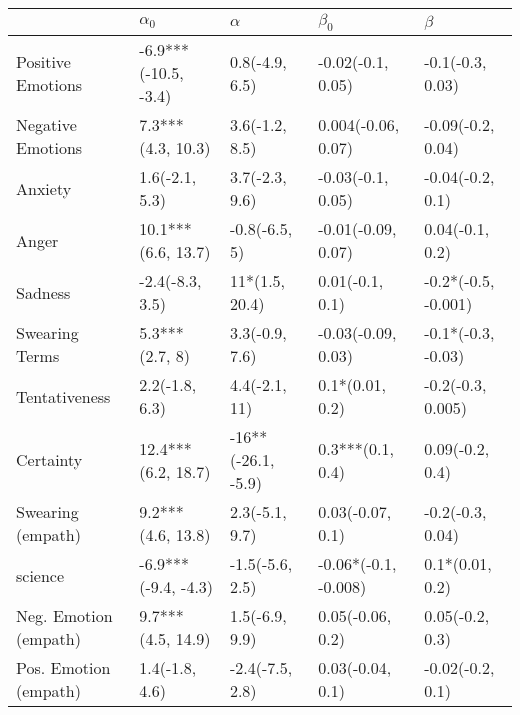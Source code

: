 \begin{tabular}{lllll}
\toprule
{} &            $\alpha_0$ &            $\alpha$ &             $\beta_0$ &              $\beta$ \\
\midrule
Positive Emotions     &  -6.9***(-10.5, -3.4) &      0.8(-4.9, 6.5) &     -0.02(-0.1, 0.05) &     -0.1(-0.3, 0.03) \\
Negative Emotions     &     7.3***(4.3, 10.3) &      3.6(-1.2, 8.5) &    0.004(-0.06, 0.07) &    -0.09(-0.2, 0.04) \\
Anxiety               &        1.6(-2.1, 5.3) &      3.7(-2.3, 9.6) &     -0.03(-0.1, 0.05) &     -0.04(-0.2, 0.1) \\
Anger                 &    10.1***(6.6, 13.7) &       -0.8(-6.5, 5) &    -0.01(-0.09, 0.07) &      0.04(-0.1, 0.2) \\
Sadness               &       -2.4(-8.3, 3.5) &      11*(1.5, 20.4) &       0.01(-0.1, 0.1) &  -0.2*(-0.5, -0.001) \\
Swearing Terms        &        5.3***(2.7, 8) &      3.3(-0.9, 7.6) &    -0.03(-0.09, 0.03) &   -0.1*(-0.3, -0.03) \\
Tentativeness         &        2.2(-1.8, 6.3) &       4.4(-2.1, 11) &       0.1*(0.01, 0.2) &    -0.2(-0.3, 0.005) \\
Certainty             &    12.4***(6.2, 18.7) &  -16**(-26.1, -5.9) &      0.3***(0.1, 0.4) &      0.09(-0.2, 0.4) \\
Swearing (empath)     &     9.2***(4.6, 13.8) &      2.3(-5.1, 9.7) &      0.03(-0.07, 0.1) &     -0.2(-0.3, 0.04) \\
science               &   -6.9***(-9.4, -4.3) &     -1.5(-5.6, 2.5) &  -0.06*(-0.1, -0.008) &      0.1*(0.01, 0.2) \\
Neg. Emotion (empath) &     9.7***(4.5, 14.9) &      1.5(-6.9, 9.9) &      0.05(-0.06, 0.2) &      0.05(-0.2, 0.3) \\
Pos. Emotion (empath) &        1.4(-1.8, 4.6) &     -2.4(-7.5, 2.8) &      0.03(-0.04, 0.1) &     -0.02(-0.2, 0.1) \\
\bottomrule
\end{tabular}
